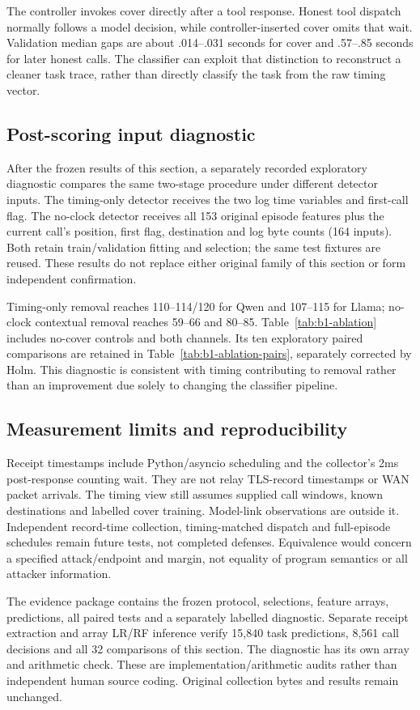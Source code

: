 The controller invokes cover directly after a tool response. Honest tool dispatch normally follows a model decision, while controller-inserted cover omits that wait. Validation median gaps are about .014--.031 seconds for cover and .57--.85 seconds for later honest calls. The classifier can exploit that distinction to reconstruct a cleaner task trace, rather than directly classify the task from the raw timing vector.

\subsection{Post-scoring input diagnostic}
After the frozen results of this section, a separately recorded exploratory diagnostic compares the same two-stage procedure under different detector inputs. The timing-only detector receives the two log time variables and first-call flag. The no-clock detector receives all 153 original episode features plus the current call's position, first flag, destination and log byte counts (164 inputs). Both retain train/validation fitting and selection; the same test fixtures are reused. These results do not replace either original family of this section or form independent confirmation.

Timing-only removal reaches 110--114/120 for Qwen and 107--115 for Llama; no-clock contextual removal reaches 59--66 and 80--85. Table~\ref{tab:b1-ablation} includes no-cover controls and both channels. Its ten exploratory paired comparisons are retained in Table~\ref{tab:b1-ablation-pairs}, separately corrected by Holm. This diagnostic is consistent with timing contributing to removal rather than an improvement due solely to changing the classifier pipeline.




\subsection{Measurement limits and reproducibility}
Receipt timestamps include Python/asyncio scheduling and the collector's 2ms post-response counting wait. They are not relay TLS-record timestamps or WAN packet arrivals. The timing view still assumes supplied call windows, known destinations and labelled cover training. Model-link observations are outside it. Independent record-time collection, timing-matched dispatch and full-episode schedules remain future tests, not completed defenses. Equivalence would concern a specified attack/endpoint and margin, not equality of program semantics or all attacker information.

The evidence package contains the frozen protocol, selections, feature arrays, predictions, all paired tests and a separately labelled diagnostic. Separate receipt extraction and array LR/RF inference verify 15,840 task predictions, 8,561 call decisions and all 32 comparisons of this section. The diagnostic has its own array and arithmetic check. These are implementation/arithmetic audits rather than independent human source coding. Original collection bytes and results remain unchanged.

